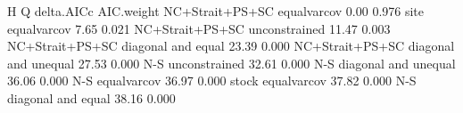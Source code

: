 \begin{Schunk}
\begin{Soutput}
               H                    Q delta.AICc AIC.weight
 NC+Strait+PS+SC          equalvarcov       0.00      0.976
            site          equalvarcov       7.65      0.021
 NC+Strait+PS+SC        unconstrained      11.47      0.003
 NC+Strait+PS+SC   diagonal and equal      23.39      0.000
 NC+Strait+PS+SC diagonal and unequal      27.53      0.000
             N-S        unconstrained      32.61      0.000
             N-S diagonal and unequal      36.06      0.000
             N-S          equalvarcov      36.97      0.000
           stock          equalvarcov      37.82      0.000
             N-S   diagonal and equal      38.16      0.000
\end{Soutput}
\end{Schunk}
